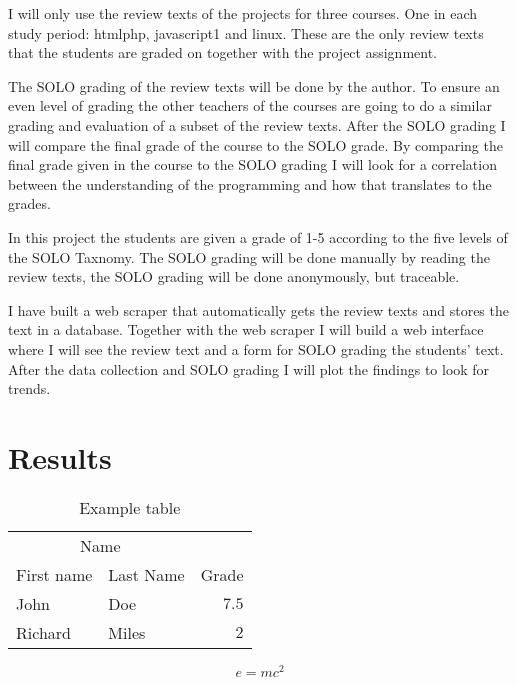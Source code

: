 \documentclass[twoside,twocolumn,a4paper,11pt,english]{article}
\begin{document}
I will only use the review texts of the projects for three courses. One in each study period: htmlphp, javascript1 and linux. These are the only review texts that the students are graded on together with the project assignment.

The SOLO grading of the review texts will be done by the author. To ensure an even level of grading the other teachers of the courses are going to do a similar grading and evaluation of a subset of the review texts. After the SOLO grading I will compare the final grade of the course to the SOLO grade. By comparing the final grade given in the course to the SOLO grading I will look for a correlation between the understanding of the programming and how that translates to the grades.

In this project the students are given a grade of 1-5 according to the five levels of the SOLO Taxnomy. The SOLO grading will be done manually by reading the review texts, the SOLO grading will be done anonymously, but traceable.

I have built a web scraper that automatically gets the review texts and stores the text in a database. Together with the web scraper I will build a web interface where I will see the review text and a form for SOLO grading the students' text. After the data collection and SOLO grading I will plot the findings to look for trends.


\section{Results}

\begin{table}
\caption{Example table}
\centering
\begin{tabular}{llr}
\toprule
\multicolumn{2}{c}{Name} \\
\cmidrule(r){1-2}
First name & Last Name & Grade \\
\midrule
John & Doe & $7.5$ \\
Richard & Miles & $2$ \\
\bottomrule
\end{tabular}
\end{table}

\blindtext %

\begin{equation}
\label{eq:emc}
e = mc^2
\end{equation}
\end{document}
